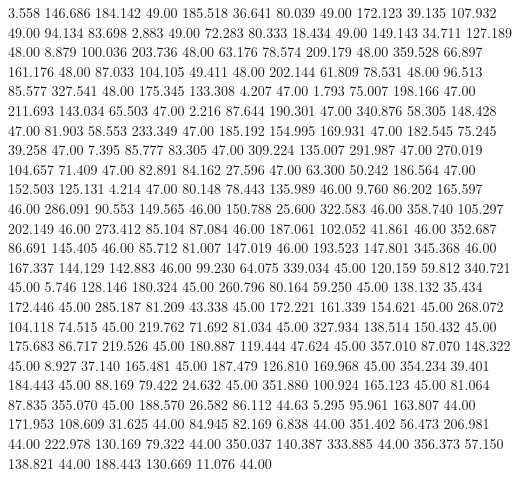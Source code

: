    3.558  146.686  184.142        49.00
 185.518   36.641   80.039        49.00
 172.123   39.135  107.932        49.00
  94.134   83.698    2.883        49.00
  72.283   80.333   18.434        49.00
 149.143   34.711  127.189        48.00
   8.879  100.036  203.736        48.00
  63.176   78.574  209.179        48.00
 359.528   66.897  161.176        48.00
  87.033  104.105   49.411        48.00
 202.144   61.809   78.531        48.00
  96.513   85.577  327.541        48.00
 175.345  133.308    4.207        47.00
   1.793   75.007  198.166        47.00
 211.693  143.034   65.503        47.00
   2.216   87.644  190.301        47.00
 340.876   58.305  148.428        47.00
  81.903   58.553  233.349        47.00
 185.192  154.995  169.931        47.00
 182.545   75.245   39.258        47.00
   7.395   85.777   83.305        47.00
 309.224  135.007  291.987        47.00
 270.019  104.657   71.409        47.00
  82.891   84.162   27.596        47.00
  63.300   50.242  186.564        47.00
 152.503  125.131    4.214        47.00
  80.148   78.443  135.989        46.00
   9.760   86.202  165.597        46.00
 286.091   90.553  149.565        46.00
 150.788   25.600  322.583        46.00
 358.740  105.297  202.149        46.00
 273.412   85.104   87.084        46.00
 187.061  102.052   41.861        46.00
 352.687   86.691  145.405        46.00
  85.712   81.007  147.019        46.00
 193.523  147.801  345.368        46.00
 167.337  144.129  142.883        46.00
  99.230   64.075  339.034        45.00
 120.159   59.812  340.721        45.00
   5.746  128.146  180.324        45.00
 260.796   80.164   59.250        45.00
 138.132   35.434  172.446        45.00
 285.187   81.209   43.338        45.00
 172.221  161.339  154.621        45.00
 268.072  104.118   74.515        45.00
 219.762   71.692   81.034        45.00
 327.934  138.514  150.432        45.00
 175.683   86.717  219.526        45.00
 180.887  119.444   47.624        45.00
 357.010   87.070  148.322        45.00
   8.927   37.140  165.481        45.00
 187.479  126.810  169.968        45.00
 354.234   39.401  184.443        45.00
  88.169   79.422   24.632        45.00
 351.880  100.924  165.123        45.00
  81.064   87.835  355.070        45.00
 188.570   26.582   86.112        44.63
   5.295   95.961  163.807        44.00
 171.953  108.609   31.625        44.00
  84.945   82.169    6.838        44.00
 351.402   56.473  206.981        44.00
 222.978  130.169   79.322        44.00
 350.037  140.387  333.885        44.00
 356.373   57.150  138.821        44.00
 188.443  130.669   11.076        44.00
